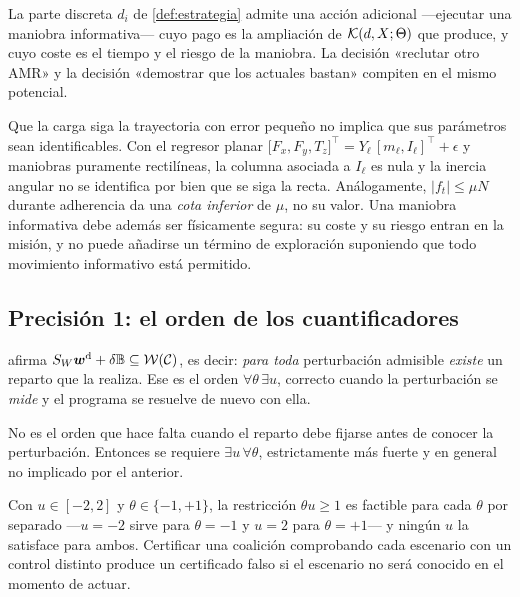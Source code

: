 \begin{corolario}
\label{co:medir}
La parte discreta $d_i$ de \cref{def:estrategia} admite una acción adicional
—ejecutar una maniobra informativa— cuyo pago es la ampliación de
$\mathcal{K}(d,X;\Theta)$ que produce, y cuyo coste es el tiempo y el riesgo de la
maniobra. La decisión «reclutar otro AMR» y la decisión «demostrar que los
actuales bastan» compiten en el mismo potencial.
\end{corolario}

\begin{observacion}
\label{obs:identificacion}
Que la carga siga la trayectoria con error pequeño no implica que sus parámetros
sean identificables. Con el regresor planar
$\bigl[F_x,F_y,T_z\bigr]^{\!\top}=Y_\ell\,[m_\ell,I_\ell]^{\!\top}+\epsilon$ y
maniobras puramente rectilíneas, la columna asociada a $I_\ell$ es nula y la
inercia angular no se identifica por bien que se siga la recta. Análogamente,
$|f_t|\le\mu N$ durante adherencia da una \emph{cota inferior} de $\mu$, no su
valor. Una maniobra informativa debe además ser físicamente segura: su coste y
su riesgo entran en la misión, y no puede añadirse un término de exploración
suponiendo que todo movimiento informativo está permitido.
\end{observacion}

\subsection{Precisión 1: el orden de los cuantificadores}

 afirma $S_W\bm{w}^{\mathrm{d}}+\delta\mathbb B\subseteq\mathcal W(\mathcal{C})$, es
decir: \emph{para toda} perturbación admisible \emph{existe} un reparto que la
realiza. Ese es el orden $\forall\theta\,\exists u$, correcto cuando la
perturbación se \emph{mide} y el programa se resuelve de nuevo con ella.

No es el orden que hace falta cuando el reparto debe fijarse antes de conocer la
perturbación. Entonces se requiere $\exists u\,\forall\theta$, estrictamente más
fuerte y en general no implicado por el anterior.

\begin{observacion}
\label{obs:cuantificadores}
Con $u\in[-2,2]$ y $\theta\in\{-1,+1\}$, la restricción $\theta u\ge1$ es
factible para cada $\theta$ por separado —$u=-2$ sirve para $\theta=-1$ y $u=2$
para $\theta=+1$— y ningún $u$ la satisface para ambos. Certificar una coalición
comprobando cada escenario con un control distinto produce un certificado falso
si el escenario no será conocido en el momento de actuar.
\end{observacion}

